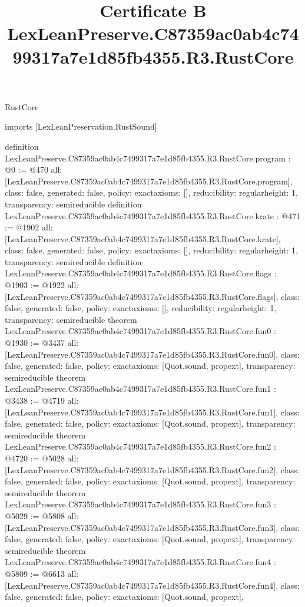 \begin{lexlean}{RustCore}
\title{Certificate B LexLeanPreserve.C87359ac0ab4c7499317a7e1d85fb4355.R3.RustCore}
\begin{coremodule}
imports [LexLeanPreservation.RustSound]

definition LexLeanPreserve.C87359ac0ab4c7499317a7e1d85fb4355.R3.RustCore.program : @0 := @470 {
  all: [LexLeanPreserve.C87359ac0ab4c7499317a7e1d85fb4355.R3.RustCore.program],
  class: false,
  generated: false,
  policy: exact{axioms: []},
  reducibility: regular{height: 1},
  transparency: semireducible
}
definition LexLeanPreserve.C87359ac0ab4c7499317a7e1d85fb4355.R3.RustCore.krate : @471 := @1902 {
  all: [LexLeanPreserve.C87359ac0ab4c7499317a7e1d85fb4355.R3.RustCore.krate],
  class: false,
  generated: false,
  policy: exact{axioms: []},
  reducibility: regular{height: 1},
  transparency: semireducible
}
definition LexLeanPreserve.C87359ac0ab4c7499317a7e1d85fb4355.R3.RustCore.flags : @1903 := @1922 {
  all: [LexLeanPreserve.C87359ac0ab4c7499317a7e1d85fb4355.R3.RustCore.flags],
  class: false,
  generated: false,
  policy: exact{axioms: []},
  reducibility: regular{height: 1},
  transparency: semireducible
}
theorem LexLeanPreserve.C87359ac0ab4c7499317a7e1d85fb4355.R3.RustCore.fun0 : @1930 := @3437 {
  all: [LexLeanPreserve.C87359ac0ab4c7499317a7e1d85fb4355.R3.RustCore.fun0],
  class: false,
  generated: false,
  policy: exact{axioms: [Quot.sound, propext]},
  transparency: semireducible
}
theorem LexLeanPreserve.C87359ac0ab4c7499317a7e1d85fb4355.R3.RustCore.fun1 : @3438 := @4719 {
  all: [LexLeanPreserve.C87359ac0ab4c7499317a7e1d85fb4355.R3.RustCore.fun1],
  class: false,
  generated: false,
  policy: exact{axioms: [Quot.sound, propext]},
  transparency: semireducible
}
theorem LexLeanPreserve.C87359ac0ab4c7499317a7e1d85fb4355.R3.RustCore.fun2 : @4720 := @5028 {
  all: [LexLeanPreserve.C87359ac0ab4c7499317a7e1d85fb4355.R3.RustCore.fun2],
  class: false,
  generated: false,
  policy: exact{axioms: [Quot.sound, propext]},
  transparency: semireducible
}
theorem LexLeanPreserve.C87359ac0ab4c7499317a7e1d85fb4355.R3.RustCore.fun3 : @5029 := @5808 {
  all: [LexLeanPreserve.C87359ac0ab4c7499317a7e1d85fb4355.R3.RustCore.fun3],
  class: false,
  generated: false,
  policy: exact{axioms: [Quot.sound, propext]},
  transparency: semireducible
}
theorem LexLeanPreserve.C87359ac0ab4c7499317a7e1d85fb4355.R3.RustCore.fun4 : @5809 := @6613 {
  all: [LexLeanPreserve.C87359ac0ab4c7499317a7e1d85fb4355.R3.RustCore.fun4],
  class: false,
  generated: false,
  policy: exact{axioms: [Quot.sound, propext]},
}
\end{coremodule}
\end{lexlean}
